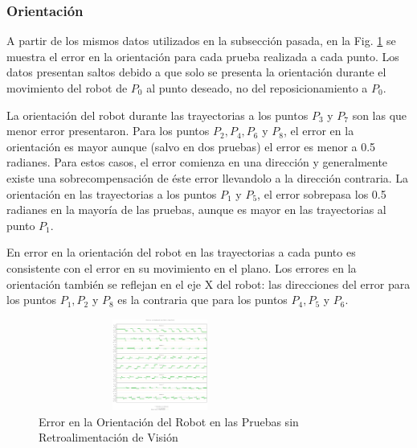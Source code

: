\documentclass[twocolumn,10pt]{amrob}
\begin{document}
\subsubsection*{Orientación}
A partir de los mismos datos utilizados en la subsección pasada, en la Fig. \ref{fig:orient_without_vision}
se muestra el error en la orientación para cada prueba realizada a cada punto. Los datos presentan saltos debido a que solo se presenta la orientación durante el movimiento del robot de $P_0$ al punto deseado, no del reposicionamiento a $P_0$.
\par
La orientación del robot durante las trayectorias a los puntos $P_3$ y $P_7$ son las que menor error presentaron. Para los puntos $P_2, P_4, P_6$ y $P_8$, el error en la orientación es mayor aunque (salvo en dos pruebas) el error es menor a 0.5 radianes. Para estos casos, el error comienza en una dirección y generalmente existe una sobrecompensación de éste error llevandolo a la dirección contraria. La orientación en las trayectorias a los puntos $P_1$ y $P_5$, el error sobrepasa los 0.5 radianes en la mayoría de las pruebas, aunque es mayor en las trayectorias al punto $P_1$. 
\par
En error en la orientación del robot en las trayectorias a cada punto es consistente con el error en su movimiento en el plano. Los errores en la orientación también se reflejan en el eje X del robot: las direcciones del error para los puntos $P_1, P_2 $ y $P_8$ es la contraria que para los puntos $P_4, P_5$ y $P_6$.
\begin{figure}
  \centering
    \includegraphics[height=3cm,width=8cm]{8pts260517-without_vision-multi-theta.eps}
  \caption{Error en la Orientación del Robot en las Pruebas sin Retroalimentación de Visión}
  \label{fig:orient_without_vision}
\end{figure}
\end{document}
